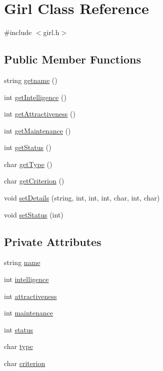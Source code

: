 \hypertarget{classGirl}{}\section{Girl Class Reference}
\label{classGirl}


{\ttfamily \#include $<$girl.\+h$>$}

\subsection*{Public Member Functions}
\begin{DoxyCompactItemize}
\item 
string \hyperlink{classGirl_a321ead86446e014c9b513eba8f811feb}{getname} ()
\item 
int \hyperlink{classGirl_afe73c4c4f180aa8f5e0bc4f87455ec0b}{get\+Intelligence} ()
\item 
int \hyperlink{classGirl_a04cfe3e0c21240f92c19152630a40252}{get\+Attractiveness} ()
\item 
int \hyperlink{classGirl_a6192affb0721b385d2c5d83a011a869e}{get\+Maintenance} ()
\item 
int \hyperlink{classGirl_af8412c80e48e58d5e19f85f30300f8cf}{get\+Status} ()
\item 
char \hyperlink{classGirl_af26252dbf5784c2c79744dd4652a3bf2}{get\+Type} ()
\item 
char \hyperlink{classGirl_a9dcd593744beb19f97acc0e3bbff6f76}{get\+Criterion} ()
\item 
void \hyperlink{classGirl_a4bff314dba17278eb1093b15f7be80bd}{set\+Details} (string, int, int, int, char, int, char)
\item 
void \hyperlink{classGirl_a201527323b3fabac4b089f003b8fcc4a}{set\+Status} (int)
\end{DoxyCompactItemize}
\subsection*{Private Attributes}
\begin{DoxyCompactItemize}
\item 
string \hyperlink{classGirl_ace47c55f2f3bc3237f6acba40302b442}{name}
\item 
int \hyperlink{classGirl_a751f8b9d8f1ba139d3f512eb198c16f4}{intelligence}
\item 
int \hyperlink{classGirl_ab97bd68f8bc0ab5ee3fb9d2784ed1474}{attractiveness}
\item 
int \hyperlink{classGirl_a118d70c1341fd634eb2b050b7435fa7d}{maintenance}
\item 
int \hyperlink{classGirl_a0d710846b78083cb192a47527ade8e54}{status}
\item 
char \hyperlink{classGirl_a665ddab81c819c4555d5aa50f44f5bb1}{type}
\item 
char \hyperlink{classGirl_aec4d1ba808da61ec210291f9c7cfbf48}{criterion}
\end{DoxyCompactItemize}


